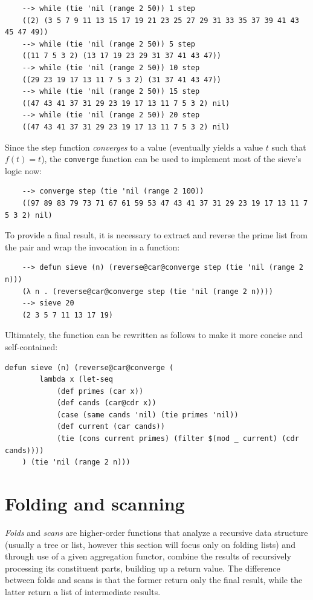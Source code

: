\begin{Verbatim}
    --> while (tie 'nil (range 2 50)) 1 step
    ((2) (3 5 7 9 11 13 15 17 19 21 23 25 27 29 31 33 35 37 39 41 43 45 47 49))
    --> while (tie 'nil (range 2 50)) 5 step
    ((11 7 5 3 2) (13 17 19 23 29 31 37 41 43 47))
    --> while (tie 'nil (range 2 50)) 10 step
    ((29 23 19 17 13 11 7 5 3 2) (31 37 41 43 47))
    --> while (tie 'nil (range 2 50)) 15 step
    ((47 43 41 37 31 29 23 19 17 13 11 7 5 3 2) nil)
    --> while (tie 'nil (range 2 50)) 20 step
    ((47 43 41 37 31 29 23 19 17 13 11 7 5 3 2) nil)
\end{Verbatim}

Since the step function \textit{converges} to a value (eventually yields a value $t$ such that $f(t) = t$), the \verb|converge| function can be used to implement most of the sieve's logic now:

\begin{Verbatim}
    --> converge step (tie 'nil (range 2 100))
    ((97 89 83 79 73 71 67 61 59 53 47 43 41 37 31 29 23 19 17 13 11 7 5 3 2) nil)
\end{Verbatim}

To provide a final result, it is necessary to extract and reverse the prime list from the pair and wrap the invocation in a function:

\begin{Verbatim}
    --> defun sieve (n) (reverse@car@converge step (tie 'nil (range 2 n)))
    (λ n . (reverse@car@converge step (tie 'nil (range 2 n))))
    --> sieve 20
    (2 3 5 7 11 13 17 19)
\end{Verbatim}

Ultimately, the function can be rewritten as follows to make it more concise and self-contained:

\begin{Verbatim}
defun sieve (n) (reverse@car@converge (
        lambda x (let-seq
            (def primes (car x))
            (def cands (car@cdr x))
            (case (same cands 'nil) (tie primes 'nil))
            (def current (car cands))
            (tie (cons current primes) (filter $(mod _ current) (cdr cands))))
    ) (tie 'nil (range 2 n)))
\end{Verbatim}

\section{Folding and scanning}

\textit{Folds} and \textit{scans} are higher-order functions that analyze a recursive data structure (usually a tree or list, however this section will focus only on folding lists) and through use of a given aggregation functor, combine the results of recursively processing its constituent parts, building up a return value. The difference between folds and scans is that the former return only the final result, while the latter return a list of intermediate results.

